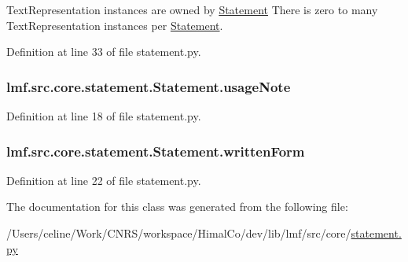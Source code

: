 Text\+Representation instances are owned by \hyperlink{classlmf_1_1src_1_1core_1_1statement_1_1_statement}{Statement} There is zero to many Text\+Representation instances per \hyperlink{classlmf_1_1src_1_1core_1_1statement_1_1_statement}{Statement}. 



Definition at line 33 of file statement.\+py.

\hypertarget{classlmf_1_1src_1_1core_1_1statement_1_1_statement_a2e146c5f5de5eed52c082c2cc0bea7d0}{
\subsubsection[{usage\+Note}]{\setlength{\rightskip}{0pt plus 5cm}lmf.\+src.\+core.\+statement.\+Statement.\+usage\+Note}}\label{classlmf_1_1src_1_1core_1_1statement_1_1_statement_a2e146c5f5de5eed52c082c2cc0bea7d0}


Definition at line 18 of file statement.\+py.

\hypertarget{classlmf_1_1src_1_1core_1_1statement_1_1_statement_a4126cee37a75d852056ae49f45cf6cc3}{
\subsubsection[{written\+Form}]{\setlength{\rightskip}{0pt plus 5cm}lmf.\+src.\+core.\+statement.\+Statement.\+written\+Form}}\label{classlmf_1_1src_1_1core_1_1statement_1_1_statement_a4126cee37a75d852056ae49f45cf6cc3}


Definition at line 22 of file statement.\+py.



The documentation for this class was generated from the following file\+:\begin{DoxyCompactItemize}
\item 
/\+Users/celine/\+Work/\+C\+N\+R\+S/workspace/\+Himal\+Co/dev/lib/lmf/src/core/\hyperlink{statement_8py}{statement.\+py}\end{DoxyCompactItemize}
